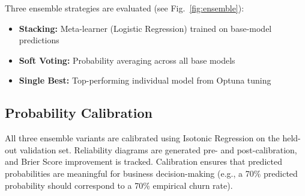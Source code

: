 \documentclass[conference]{IEEEtran}
\begin{document}
Three ensemble strategies are evaluated (see Fig.~\ref{fig:ensemble}):
\begin{itemize}
    \item \textbf{Stacking:} Meta-learner (Logistic Regression) trained on base-model predictions
    \item \textbf{Soft Voting:} Probability averaging across all base models
    \item \textbf{Single Best:} Top-performing individual model from Optuna tuning
\end{itemize}

\subsection{Probability Calibration}

All three ensemble variants are calibrated using Isotonic Regression on the held-out validation set. Reliability diagrams are generated pre- and post-calibration, and Brier Score improvement is tracked. Calibration ensures that predicted probabilities are meaningful for business decision-making (e.g., a 70\% predicted probability should correspond to a 70\% empirical churn rate).
\end{document}
